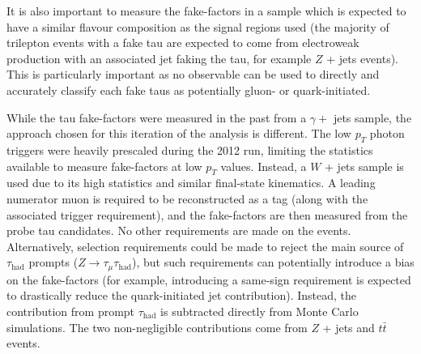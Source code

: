 It is also important to measure the fake-factors in a sample which is expected to have a
similar flavour composition as the signal regions used (the majority of trilepton events
with a fake tau are expected to come from electroweak production with an associated jet
faking the tau, for example $Z$ + jets events).  This is particularly important as no
observable can be used to directly and accurately classify each fake taus as potentially
gluon- or quark-initiated.
 
While the tau fake-factors were measured in the past from a $\gamma + $ jets sample, the
approach chosen for this iteration of the analysis is different.  
The low $p_{T}$ photon triggers were heavily prescaled during the 2012 run, limiting the
statistics available to measure fake-factors at low $p_{T}$ values.  Instead, a $W$ + jets
sample is used due to its high statistics and similar final-state kinematics.  A leading
numerator muon is required to be reconstructed as a tag (along with the associated trigger
requirement), and the fake-factors are then measured from the probe tau candidates.  No
other requirements are made on the events.  Alternatively, selection requirements could be
made to reject the main source of $\tau_{\mathrm{had}}$ prompts ($Z\rightarrow
\tau_{\mu}\tau_{\mathrm{had}}$), but such requirements can potentially introduce a bias on
the fake-factors (for example, introducing a same-sign requirement is expected to
drastically reduce the quark-initiated jet contribution).  Instead, the contribution from
prompt $\tau_{\mathrm{had}}$ is subtracted directly from Monte Carlo simulations.  The two
non-negligible contributions come from $Z$ + jets and $t\bar{t}$ events.

